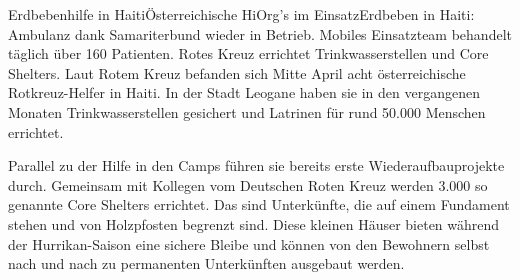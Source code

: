 \begin{NewsItem}{}{Erdbebenhilfe in Haiti}{Österreichische HiOrg's im
Einsatz}{Erdbeben in Haiti: Ambulanz dank Samariterbund wieder in Betrieb.
Mobiles Einsatzteam behandelt täglich über 160 Patienten. Rotes Kreuz errichtet
Trinkwasserstellen und Core Shelters.} {}
Laut Rotem Kreuz befanden sich Mitte April acht österreichische Rotkreuz-Helfer
in Haiti. In der Stadt Leogane haben sie in den vergangenen Monaten
Trinkwasserstellen gesichert und Latrinen für rund 50.000 Menschen errichtet.

Parallel zu der Hilfe in den Camps führen sie bereits erste Wiederaufbauprojekte
durch. Gemeinsam mit Kollegen vom Deutschen Roten Kreuz werden 3.000 so genannte
Core Shelters errichtet. Das sind Unterkünfte, die auf einem Fundament stehen und
von Holzpfosten begrenzt sind. Diese kleinen Häuser bieten während der
Hurrikan-Saison eine sichere Bleibe und können von den Bewohnern selbst nach und
nach zu permanenten Unterkünften ausgebaut werden.
\end{NewsItem}


\ChapterEnd
